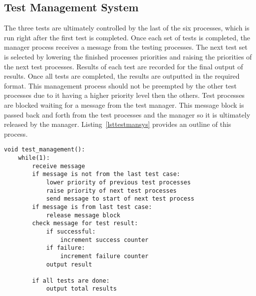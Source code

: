 \documentclass[oneside]{article}
\begin{document}
\subsection*{Test Management System}
The three tests are ultimately controlled by the last of the six processes,
which is run right after the first test is completed. Once each set of tests is
completed, the manager process receives a message from the testing processes.
The next test set is selected by lowering the finished processes priorities and
raising the priorities of the next test processes. Results of each test are
recorded for the final output of results. Once all tests are completed, the
results are outputted in the required format. This management process should
not be preempted by the other test processes due to it having a higher priority
level then the others. Test processes are blocked waiting for a message from
the test manager. This message block is passed back and forth from the test
processes and the manager so it is ultimately released by the manager.
Listing~\ref{lsttestmansys} provides an outline of this process.

\begin{lstlisting}
void test_management():
    while(1):
        receive message
        if message is not from the last test case:
            lower priority of previous test processes
            raise priority of next test processes
            send message to start of next test process
        if message is from last test case:
            release message block
        check message for test result:
            if successful:
                increment success counter
            if failure:
                increment failure counter
            output result
        
        if all tests are done:
            output total results
\end{lstlisting}
\end{document}
